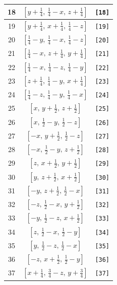 \documentclass[fleqn,8pt]{jsarticle}
\begin{document}
\begin{longtable}{ccc}
18 & $\left[ y + \frac{1}{4},\, \frac{1}{4} - x,\, z + \frac{1}{4} \right]$ & {\tt [18]} \\ \hline
19 & $\left[ y + \frac{1}{4},\, x + \frac{1}{4},\, \frac{1}{4} - z \right]$ & {\tt [19]} \\ \hline
20 & $\left[ \frac{1}{4} - y,\, \frac{1}{4} - x,\, \frac{1}{4} - z \right]$ & {\tt [20]} \\ \hline
21 & $\left[ \frac{1}{4} - x,\, z + \frac{1}{4},\, y + \frac{1}{4} \right]$ & {\tt [21]} \\ \hline
22 & $\left[ \frac{1}{4} - x,\, \frac{1}{4} - z,\, \frac{1}{4} - y \right]$ & {\tt [22]} \\ \hline
23 & $\left[ z + \frac{1}{4},\, \frac{1}{4} - y,\, x + \frac{1}{4} \right]$ & {\tt [23]} \\ \hline
24 & $\left[ \frac{1}{4} - z,\, \frac{1}{4} - y,\, \frac{1}{4} - x \right]$ & {\tt [24]} \\ \hline
25 & $\left[ x,\, y + \frac{1}{2},\, z + \frac{1}{2} \right]$ & {\tt [25]} \\ \hline
26 & $\left[ x,\, \frac{1}{2} - y,\, \frac{1}{2} - z \right]$ & {\tt [26]} \\ \hline
27 & $\left[ - x,\, y + \frac{1}{2},\, \frac{1}{2} - z \right]$ & {\tt [27]} \\ \hline
28 & $\left[ - x,\, \frac{1}{2} - y,\, z + \frac{1}{2} \right]$ & {\tt [28]} \\ \hline
29 & $\left[ z,\, x + \frac{1}{2},\, y + \frac{1}{2} \right]$ & {\tt [29]} \\ \hline
30 & $\left[ y,\, z + \frac{1}{2},\, x + \frac{1}{2} \right]$ & {\tt [30]} \\ \hline
31 & $\left[ - y,\, z + \frac{1}{2},\, \frac{1}{2} - x \right]$ & {\tt [31]} \\ \hline
32 & $\left[ - z,\, \frac{1}{2} - x,\, y + \frac{1}{2} \right]$ & {\tt [32]} \\ \hline
33 & $\left[ - y,\, \frac{1}{2} - z,\, x + \frac{1}{2} \right]$ & {\tt [33]} \\ \hline
34 & $\left[ z,\, \frac{1}{2} - x,\, \frac{1}{2} - y \right]$ & {\tt [34]} \\ \hline
35 & $\left[ y,\, \frac{1}{2} - z,\, \frac{1}{2} - x \right]$ & {\tt [35]} \\ \hline
36 & $\left[ - z,\, x + \frac{1}{2},\, \frac{1}{2} - y \right]$ & {\tt [36]} \\ \hline
37 & $\left[ x + \frac{1}{4},\, \frac{3}{4} - z,\, y + \frac{3}{4} \right]$ & {\tt [37]} \\ \hline

\end{longtable}
\end{document}
